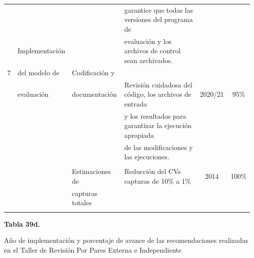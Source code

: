 \documentclass[
  spanish,
]{article}
\begin{document}
\begin{table}[h]
{\begin{tabular}{|c|l|l|l|c|c|}
     &               &                      & garantice que todas las versiones del programa de     &         & \\
     & Implementación&                      & evaluación y los archivos de control sean archivados. &         & \\
  7  & del modelo de & Codificación y       &                                                       &         & \\
     & evaluación    & documentación        & Revisión cuidadosa del código, los archivos de entrada&2020/21 & 95\% \\
     &               &                      & y los resultados para garantizar la ejecución apropiada&        & \\
     &               &                      & de las modificaciones y las ejecuciones.              &         & \\
     &               &                      &                                                       &         & \\ 
     &               & Estimaciones de      & Reducción del CVs capturas de 10\% a 1\%              & 2014    & 100\% \\
     &               & capturas totales     &                                                       &         & \\
     &               &                      &                                                       &         & \\ \hline
 \end{tabular}}
    \end{table}

\pagebreak

\small
\begin{center} 
\textbf{Tabla 39d.}
\end{center}
\begin{center} 
\vspace{-0.2cm} Año de implementación y porcentaje de avance de las recomendaciones realizadas en el Taller de Revisión Por Pares Externa e Independiente
\end{center}
\vspace{-0.2cm}
\end{document}
